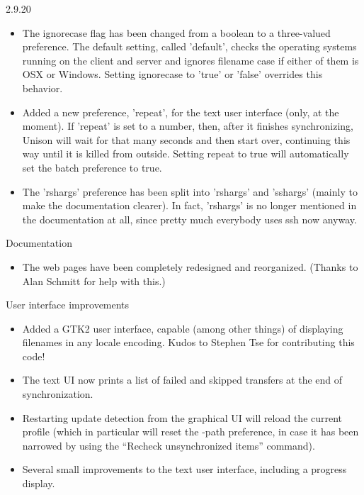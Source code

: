 \begin{changesfromversion}{2.9.20}
\begin{itemize}
\item The ignorecase flag has been changed from a boolean to a three-valued
  preference.  The default setting, called 'default', checks the operating systems
  running on the client and server and ignores filename case if either of them is
  OSX or Windows.  Setting ignorecase to 'true' or 'false' overrides this behavior.
  
\item Added a new preference, 'repeat', for the text user interface (only,
  at the moment).  If 'repeat' is set to a number, then, after it finishes
  synchronizing, Unison will wait for that many seconds and then start over,
  continuing this way until it is killed from outside.  Setting repeat to
  true will automatically set the batch preference to true.

\item The 'rshargs' preference has been split into 'rshargs' and 'sshargs' 
  (mainly to make the documentation clearer).  In fact, 'rshargs' is no longer
  mentioned in the documentation at all, since pretty much everybody uses
  ssh now anyway.
\end{itemize}

\item Documentation
\begin{itemize}
\item The web pages have been completely redesigned and reorganized.
  (Thanks to Alan Schmitt for help with this.)
\end{itemize}

\item User interface improvements
\begin{itemize}
\item Added a GTK2 user interface, capable (among other things) of displaying filenames
  in any locale encoding.  Kudos to Stephen Tse for contributing this code!  
\item The text UI now prints a list of failed and skipped transfers at the end of
  synchronization. 
\item Restarting update detection from the graphical UI will reload the current
  profile (which in particular will reset the -path preference, in case
  it has been narrowed by using the ``Recheck unsynchronized items''
  command).
\item Several small improvements to the text user interface, including a
  progress display.
\end{itemize}


\end{changesfromversion}
